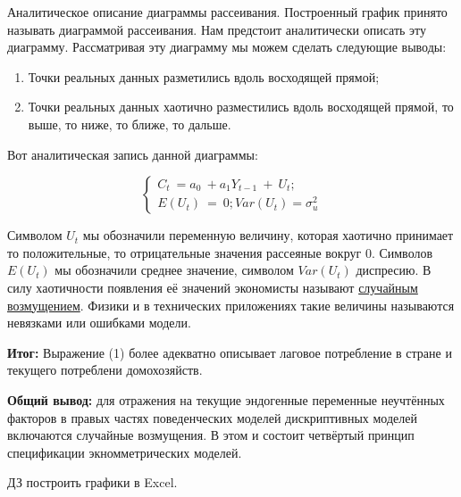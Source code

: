 \documentclass[12pt,a4paper]{article}
\begin{document}
	Аналитическое описание диаграммы рассеивания. Построенный график принято называть диаграммой рассеивания. Нам предстоит аналитически описать эту диаграмму. Рассматривая эту диаграмму мы можем сделать следующие выводы:
\begin{enumerate}
\item Точки реальных данных разметились вдоль восходящей прямой;
\item Точки реальных данных хаотично разместились вдоль восходящей прямой, то выше, то ниже, то ближе, то дальше.
\end{enumerate}

	Вот аналитическая запись данной диаграммы:
	
\begin{equation}
\begin{cases}
C_{t} \ =a_{0} \ +a_{1} Y_{t-1} \ +\ U_{t} ;\\
E( U_{t}) \ =\ 0;Var( U_{t}) = \sigma^{2}_{u}
\end{cases}
\end{equation}

	Символом $\displaystyle U_{t}$ мы обозначили переменную величину, которая хаотично принимает то положительные, то отрицательные значения рассеяные вокруг 0. Символов $\displaystyle E( U_{t})$ мы обозначили среднее значение, символом $\displaystyle Var( U_{t})$ диспресию. В силу хаотичности появления её значений экономисты называют \underline{случайным возмущением}. Физики и в технических приложениях такие величины называются невязками или ошибками модели.

\textbf{Итог: }Выражение (1) более адекватно описывает лаговое потребление в стране и текущего потреблени домохозяйств.

	\textbf{Общий вывод:} для отражения на текущие эндогенные переменные неучтённых факторов в правых частях поведенческих моделей дискриптивных моделей включаются случайные возмущения. В этом и состоит четвёртый принцип спецификации экномметрических моделей.

	$\displaystyle \boxed{\text{ДЗ}}$ построить графики в Excel.
\end{document}

